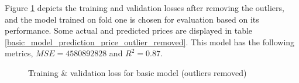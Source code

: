 \documentclass[12pt,twoside]{report}
\begin{document}
Figure \ref{all_full_epoch_1000_outlier_removed} depicts the training and validation losses after removing the outliers, and the model trained on fold one is chosen for evaluation based on its performance. Some actual and predicted prices are displayed in table \ref{basic_model_prediction_price_outlier_removed}. This model has the following metrics, $MSE = 4580892828$ and $R^2 = 0.87$. 
\begin{figure}[!htbp]
	\centering
	\hfill
	\hfill
	\hfil
	\hfil
	\caption{Training \& validation loss for basic model (outliers removed)}
	\label{all_full_epoch_1000_outlier_removed}
\end{figure}
\end{document}
